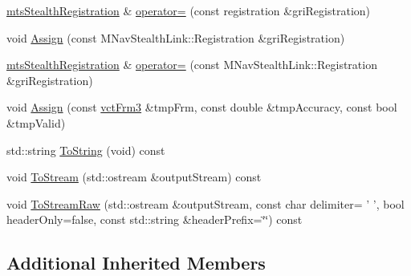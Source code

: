 \begin{DoxyCompactItemize}
\item 
\hyperlink{classmts_stealth_registration}{mts\-Stealth\-Registration} \& \hyperlink{classmts_stealth_registration_ad2750b56f0c2164e6537f2bc54215366}{operator=} (const registration \&gri\-Registration)
\item 
void \hyperlink{classmts_stealth_registration_a947218de69c47685ed23fd9d33f9211b}{Assign} (const M\-Nav\-Stealth\-Link\-::\-Registration \&gri\-Registration)
\item 
\hyperlink{classmts_stealth_registration}{mts\-Stealth\-Registration} \& \hyperlink{classmts_stealth_registration_a40b55f90ec7cffe938e238b9a35b1b03}{operator=} (const M\-Nav\-Stealth\-Link\-::\-Registration \&gri\-Registration)
\item 
void \hyperlink{classmts_stealth_registration_add68c38da3f107b0a49ed3995b817612}{Assign} (const \hyperlink{vct_transformation_types_8h_a81feda0a02c2d1bc26e5553f409fed20}{vct\-Frm3} \&tmp\-Frm, const double \&tmp\-Accuracy, const bool \&tmp\-Valid)
\item 
std\-::string \hyperlink{classmts_stealth_registration_a215e104863a987ea4253519864c2b65d}{To\-String} (void) const 
\item 
void \hyperlink{classmts_stealth_registration_adba3ddfdec70f8ff3212e2cd540cbcf8}{To\-Stream} (std\-::ostream \&output\-Stream) const 
\item 
void \hyperlink{classmts_stealth_registration_acd36e1ba84f6168e0b5151048765888c}{To\-Stream\-Raw} (std\-::ostream \&output\-Stream, const char delimiter= ' ', bool header\-Only=false, const std\-::string \&header\-Prefix=\char`\"{}\char`\"{}) const 
\end{DoxyCompactItemize}
\subsection*{Additional Inherited Members}


